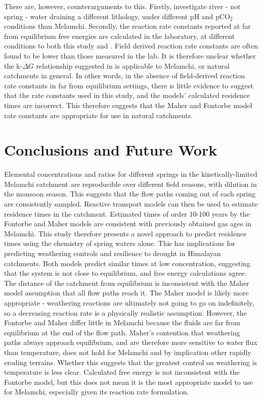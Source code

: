\bsk

There are, however, counterarguments to this. Firstly, \textcite{kampmanFeldsparDissolutionKinetics2009} investigate river - not spring - water draining a different lithology, under different pH and pCO$_2$ conditions than Melamchi. Secondly, the reaction rate constants reported at far from equilibrium free energies are calculated in the laboratory, at different conditions to both this study and \textcite{kampmanFeldsparDissolutionKinetics2009}. Field derived reaction rate constants are often found to be lower than those measured in the lab. It is therefore unclear whether the k-$\Delta G$ relationship suggested in \textcite{kampmanFeldsparDissolutionKinetics2009} is applicable to Melamchi, or natural catchments in general. In other words, in the absence of field-derived reaction rate constants in far from equilibrium settings, there is little evidence to suggest that the rate constants used in this study, and the models' calculated residence times are incorrect. This therefore suggests that the Maher and Fontorbe model rate constants are appropriate for use in natural catchments.


\newpage

\section{Conclusions and Future Work}

Elemental concentrations and ratios for different springs in the kinetically-limited Melamchi catchment are reproducible over different field seasons, with dilution in the monsoon season. This suggests that the flow paths coming out of each spring are consistently sampled. Reactive transport models can then be used to estimate residence times in the catchment. Estimated times of order 10-100 years by the Fontorbe and Maher models are consistent with previously obtained gas ages in Melamchi. This study therefore presents a novel approach to predict residence times using the chemistry of spring waters alone. This has implications for predicting weathering controls and resilience to drought in Himalayan catchments. Both models predict similar times at low concentration, suggesting that the system is not close to equilibrium, and free energy calculations agree. The distance of the catchment from equilibrium is inconsistent with the Maher model assumption that all flow paths reach it. The Maher model is likely more appropriate - weathering reactions are ultimately not going to go on indefinitely, so a decreasing reaction rate is a physically realistic assumption. However, the Fontorbe and Maher differ little in Melamchi because the fluids are far from equilibrium at the end of the flow path. Maher's contention that weathering paths always approach equilibrium, and are therefore more sensitive to water flux than temperature, does not hold for Melamchi and by implication other rapidly eroding terrains. Whether this suggests that the greatest control on weathering is temperature is less clear. Calculated free energy is not inconsistent with the Fontorbe model, but this does not mean it is the most appropriate model to use for Melamchi, especially given its reaction rate formulation.


